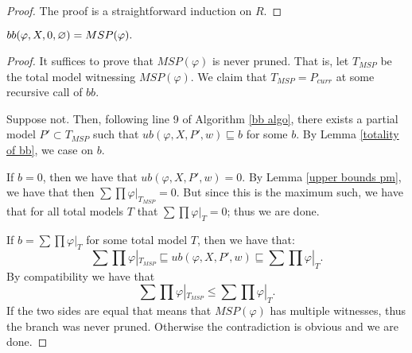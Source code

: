 \documentclass[acmsmall,review]{acmart}\settopmatter{printfolios=true,printccs=false,printacmref=false}
\begin{document}
\begin{proof}
  The proof is a straightforward induction on $R$. 
\end{proof}

\begin{theorem}\label{soundness of bb}
  $bb(\varphi, X, 0, \varnothing) = MSP(\varphi).$
\end{theorem}

\begin{proof}
  It suffices to prove that $MSP(\varphi)$ is never pruned. That is, let $T_{MSP}$ be the total model witnessing $MSP(\varphi)$. We claim that $T_{MSP} = P_{curr}$ at some recursive call of $bb$. 

  Suppose not. Then, following line 9 of Algorithm \ref{bb algo}, there exists a partial model $P' \subset T_{MSP}$ such that $ub(\varphi, X, P', w) \sqsubseteq b$ for some $b$. By Lemma \ref{totality of bb}, we case on $b$.

  If $b=0$, then we have that $ub(\varphi, X, P', w)=0$. By Lemma \ref{upper bounds pm}, we have that then $\sum\prod \varphi|_{T_{MSP}} = 0$. But since this is the maximum such, we have that for all total models $T$ that $\sum\prod \varphi|_T=0$; thus we are done.

  If $b = \sum\prod \varphi|_T$ for some total model $T$, then we have that:
  \begin{equation*}
    \sum\prod \varphi|_{T_{MSP}} \sqsubseteq ub(\varphi, X, P', w) \sqsubseteq \sum\prod \varphi|_T.
  \end{equation*}
  By compatibility we have that
  \begin{equation*}
    \sum\prod \varphi|_{T_{MSP}} \leq \sum\prod \varphi|_T.
  \end{equation*}
  If the two sides are equal that means that $MSP(\varphi)$ has multiple witnesses, thus the branch was never pruned. Otherwise the contradiction is obvious and we are done.
\end{proof}


% 


\end{document}
